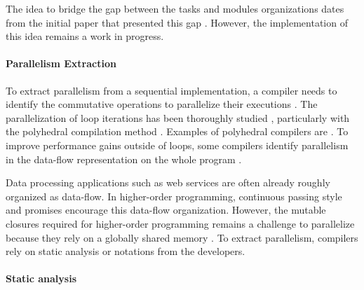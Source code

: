 The idea to bridge the gap between the tasks and modules organizations dates from the initial paper that presented this gap \cite{Parnas1972}.
However, the implementation of this idea remains a work in progress.


\paragraph{Parallelism Extraction}

To extract parallelism from a sequential implementation, a compiler needs to identify the commutative operations to parallelize their executions \cite{Rinard1996,Clements2013a}.
The parallelization of loop iterations has been thoroughly studied \cite{Mauras1989,Amarasinghe1995,Chen2008,Banerjee2013,Radoi2014}, particularly with the polyhedral compilation method \cite{Bastoul2004}.
Examples of polyhedral compilers are .
To improve performance gains outside of loops, some compilers identify parallelism in the data-flow representation on the whole program \cite{Beck1991,Catanzaro2009,Li2012}.

Data processing applications \cite{Fernandez2014a} such as web services \cite{Salmito2013} are often already roughly organized as data-flow.
In higher-order programming, continuous passing style and promises encourage this data-flow organization.
However, the mutable closures required for higher-order programming remains a challenge to parallelize because they rely on a globally shared memory \cite{Harrison1989, Nicolay2010, Matsakis2012a}.
To extract parallelism, compilers rely on static analysis or notations from the developers.


\paragraph{Static analysis}


